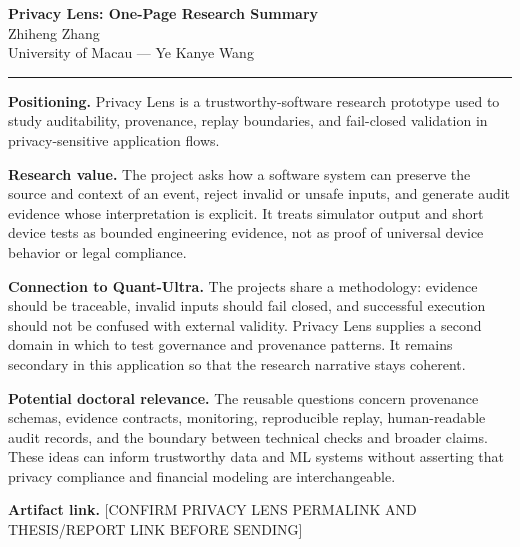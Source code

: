 \documentclass[11pt]{article}
\newcommand{\ApplicantName}{Zhiheng Zhang}
\begin{document}
\begin{center}
{\LARGE\bfseries Privacy Lens: One-Page Research Summary}\\[0.25em]
{\large \ApplicantName}\\
University of Macau --- Ye Kanye Wang
\end{center}
\vspace{0.35em}\hrule\vspace{0.65em}

\textbf{Positioning.} Privacy Lens is a trustworthy-software research prototype used to study auditability, provenance, replay boundaries, and fail-closed validation in privacy-sensitive application flows.

\textbf{Research value.} The project asks how a software system can preserve the source and context of an event, reject invalid or unsafe inputs, and generate audit evidence whose interpretation is explicit. It treats simulator output and short device tests as bounded engineering evidence, not as proof of universal device behavior or legal compliance.

\textbf{Connection to Quant-Ultra.} The projects share a methodology: evidence should be traceable, invalid inputs should fail closed, and successful execution should not be confused with external validity. Privacy Lens supplies a second domain in which to test governance and provenance patterns. It remains secondary in this application so that the research narrative stays coherent.

\textbf{Potential doctoral relevance.} The reusable questions concern provenance schemas, evidence contracts, monitoring, reproducible replay, human-readable audit records, and the boundary between technical checks and broader claims. These ideas can inform trustworthy data and ML systems without asserting that privacy compliance and financial modeling are interchangeable.

\textbf{Artifact link.} [CONFIRM PRIVACY LENS PERMALINK AND THESIS/REPORT LINK BEFORE SENDING]
\end{document}
